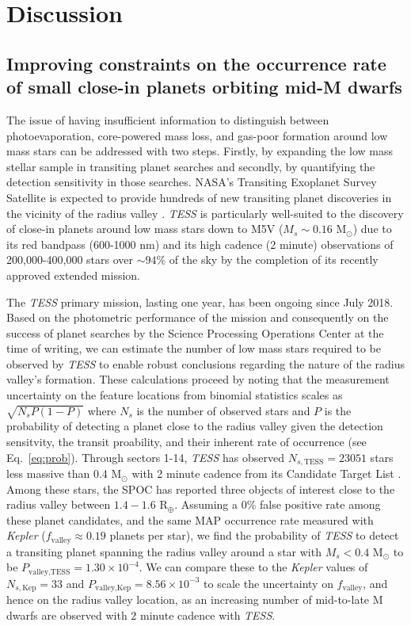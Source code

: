 \documentclass[twocolumn]{emulateapj}
\newcommand{\kepler}[1]{\emph{Kepler}#1}
\newcommand{\tess}[1]{\emph{TESS}#1}
\begin{document}
\section{Discussion} \label{sect:discussion}
\subsection{Improving constraints on the occurrence rate of small close-in planets orbiting mid-M dwarfs} \label{sect:improve}
The issue of having insufficient information to distinguish between photoevaporation, core-powered mass loss, and gas-poor
formation around low mass stars can be addressed with two steps. Firstly, by expanding the low mass stellar sample in 
transiting planet searches and secondly, by quantifying the detection sensitivity in those searches. 
NASA's Transiting Exoplanet Survey Satellite \citep[\tess{;}][]{ricker15} is expected to provide hundreds of new transiting
planet discoveries in the vicinity of the radius valley \citep{barclay18}. \tess{} is particularly well-suited to the discovery of
close-in planets around low mass stars down to M5V ($M_s\sim 0.16$ M$_{\odot}$) due to its red bandpass (600-1000 nm)
and its high cadence (2 minute) observations of 200,000-400,000 stars over $\sim 94$\% of the sky by the completion of its
recently approved extended mission.

The \tess{} primary mission, lasting one year, has been ongoing since July 2018. 
Based on the photometric performance of the mission and consequently on the success of planet searches by the
Science Processing Operations Center \citep[SPOC;][]{jenkins16,twicken18,li18} at the time of writing,
we can estimate the number of low mass stars required to be observed
by \tess{} to enable robust conclusions regarding the nature of the radius valley's formation. These calculations
proceed by noting that the measurement uncertainty on the feature locations from binomial statistics scales as
$\sqrt{N_sP(1-P)}$ where $N_s$ is the number of observed stars and $P$ is the probability of detecting a planet close to
the radius valley 
given the detection sensitvity, the transit proability, and their inherent rate of occurrence (see Eq.~\ref{eq:prob}).
Through sectors 1-14, \tess{} has observed $N_{s,\text{TESS}} = 23051$ stars less massive than 0.4 M$_{\odot}$
with 2 minute cadence from its Candidate Target List \citep[CTL;][]{stassun19}.
Among these stars, the SPOC has reported three objects of interest close to the radius valley
between $1.4-1.6$ R$_{\oplus}$. Assuming a 0\% false positive rate
among these planet candidates, and the same MAP occurrence rate measured with \kepler{}
($f_{\text{valley}}\approx 0.19$ planets per star), we find the probability of \tess{} to detect a transiting planet
spanning the radius valley around a star with $M_s<0.4$ M$_{\odot}$ to be 
$P_{\text{valley,TESS}}=1.30 \times 10^{-4}$. We can compare these to the \kepler{} values of $N_{s,\text{Kep}}=33$ and
$P_{\text{valley,Kep}}=8.56\times 10^{-3}$ to scale the uncertainty on $f_{\text{valley}}$, and hence on the radius
valley location, as an increasing number of mid-to-late M dwarfs are observed with 2 minute cadence with \tess{.}
\end{document}
